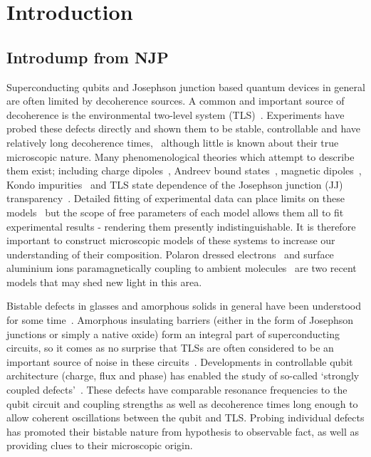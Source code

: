 \chapter{Introduction}

\section{Introdump from NJP}
Superconducting qubits and Josephson junction based quantum devices in general are often limited by decoherence sources.
A common and important source of decoherence is the environmental two-level system (TLS)~\cite{Dutta1981, Shnirman2005}.
Experiments have probed these defects directly and shown them to be stable, controllable and have relatively long decoherence times,~\cite{Simmonds2004, Neeley2008, Shalibo2010, Lupascu2009, Lisenfeld2010, Gunnarsson2013} although little is known about their true microscopic nature.
Many phenomenological theories which attempt to describe them exist; including charge dipoles~\cite{Martinis2005}, Andreev bound states~\cite{deSousa2009}, magnetic dipoles~\cite{Sendelbach2008}, Kondo impurities~\cite{Faoro2007} and TLS state dependence of the Josephson junction (JJ) transparency~\cite{Ku2005}.
Detailed fitting of experimental data can place limits on these models~\cite{Cole2010} but the scope of free parameters of each model allows them all to fit experimental results - rendering them presently indistinguishable.
It is therefore important to construct microscopic models of these systems to increase our understanding of their composition.
Polaron dressed electrons~\cite{Agarwal2013} and surface aluminium ions paramagnetically coupling to ambient molecules~\cite{Lee2014} are two recent models that may shed new light in this area.

Bistable defects in glasses and amorphous solids in general have been understood for some time~\cite{Anderson1972}.
Amorphous insulating barriers (either in the form of Josephson junctions or simply a native oxide) form an integral part of superconducting circuits, so it comes as no surprise that TLSs are often considered to be an important source of noise in these circuits~\cite{Dutta1981, Shnirman2005, Martinis2005}.
Developments in controllable qubit architecture (charge, flux and phase) has enabled the study of so-called `strongly coupled defects'~\cite{Neeley2008, Lupascu2009, Lisenfeld2010}.
These defects have comparable resonance frequencies to the qubit circuit and coupling strengths as well as decoherence times long enough to allow coherent oscillations between the qubit and TLS.
Probing individual defects has promoted their bistable nature from hypothesis to observable fact, as well as providing clues to their microscopic origin.


